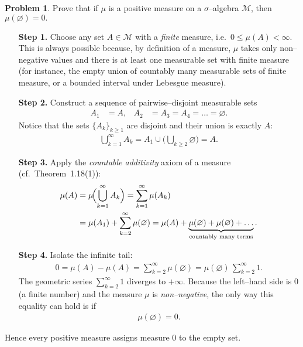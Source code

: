 \documentclass[12pt]{article}
\theoremstyle{definition} %
\newtheorem{problem}{Problem}
\theoremstyle{plain} %
\begin{document}
\begin{problem}
  Prove that if $\mu$ is a positive measure on a $\sigma$--algebra $\mathcal{M}$, then 
  $
      \mu(\varnothing)=0.
  $
  \begin{enumerate}
      \item[\textbf{Step 1.}] 
            Choose any set $A\in\mathcal{M}$ with a \emph{finite} measure, i.e.\ $0\le \mu(A)<\infty$.  
            This is always possible because, by definition of a measure, $\mu$ takes only non–negative values and 
            there is at least one measurable set with finite measure (for instance, the empty union of countably
            many measurable sets of finite measure, or a bounded interval under Lebesgue measure).

      \item[\textbf{Step 2.}] 
            Construct a sequence of pairwise–disjoint measurable sets
            \begin{align}
                A_1 &= A, &
                A_2 &= A_3 = A_4 = \dots = \varnothing .
            \end{align}
            Notice that the sets $\{A_k\}_{k\ge1}$ are disjoint and
            their union is exactly $A$:
            \begin{align}
                \bigcup_{k=1}^{\infty} A_k 
                = A_1 \cup \bigl(\bigcup_{k\ge2}\varnothing\bigr)
                = A.
            \end{align}

      \item[\textbf{Step 3.}] 
            Apply the \emph{countable additivity} axiom of a measure (cf.\ Theorem~1.18(1)):
            \begin{align}
                \mu(A)
                &= \mu\!\Bigl(\bigcup_{k=1}^{\infty} A_k\Bigr)
                = \sum_{k=1}^{\infty} \mu(A_k) \\
                &= \mu(A_1) + \sum_{k=2}^{\infty} \mu(\varnothing) 
                = \mu(A) + \underbrace{\mu(\varnothing)+\mu(\varnothing)+\dots}_{\text{countably many terms}} .
            \end{align}

      \item[\textbf{Step 4.}] 
            Isolate the infinite tail:
            \begin{align}
                0 
                = \mu(A) - \mu(A) 
                = \sum_{k=2}^{\infty} \mu(\varnothing)
                = \mu(\varnothing)\,\sum_{k=2}^{\infty} 1 .
            \end{align}
            The geometric series $\sum_{k=2}^{\infty} 1$ diverges to $+\infty$.  
            Because the left–hand side is $0$ (a finite number) and the measure $\mu$ is \emph{non–negative},
            the only way this equality can hold is if
            \begin{align}
                \mu(\varnothing)=0.
            \end{align}
  \end{enumerate}
  Hence every positive measure assigns measure $0$ to the empty set.
\end{problem}
\end{document}
